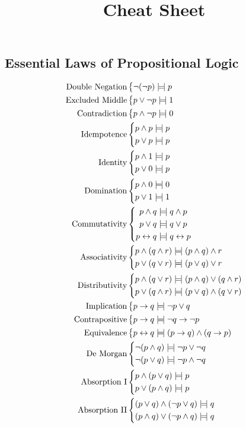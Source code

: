 \documentclass[class=cs245,nogeometry]{agony}
\title{Cheat Sheet}
\newcommand{\law}[2]{\text{#1}&\left\{\begin{aligned}#2\end{aligned}\right.\\}
\begin{document}
\begin{multicols}{2}
  \section*{Essential Laws of Propositional Logic}
  \begin{align*}
    \law{Double Negation}{\n(\n p) \tt p}
    \law{Excluded Middle}{p \o \n p \tt 1}
    \law{Contradiction}{p \a \n p \tt 0}
    \law{Idempotence}{
    p \a p                  & \tt p                    \\
    p \o p                  & \tt p                    \\
    }
    \law{Identity}{
    p \a 1                  & \tt p                    \\
    p \o 0                  & \tt p                    \\
    }
    \law{Domination}{
    p \a 0                  & \tt 0                    \\
    p \o 1                  & \tt 1                    \\
    }
    \law{Commutativity}{
    p \a q                  & \tt q \a p               \\
    p \o q                  & \tt q \o p               \\
    p \e q                  & \tt q \e p               \\
    }
    \law{Associativity}{
    p \a (q \a r)           & \tt (p \a q) \a r        \\
    p \o (q \o r)           & \tt (p \o q) \o r        \\
    }
    \law{Distributivity}{
    p \a (q \o r)           & \tt (p \a q) \o (q \a r) \\
    p \o (q \a r)           & \tt (p \o q) \a (q \o r) \\
    }
    \law{Implication}{p \i q \tt \n p \o q}
    \law{Contrapositive}{p \i q \tt \n q \i \n p}
    \law{Equivalence}{p \e q \tt (p \i q) \a (q \i p)}
    \law{De Morgan}{
    \n(p \a q)              & \tt \n p \o \n q         \\
    \n(p \o q)              & \tt \n p \a \n q         \\
    }
    \law{Absorption I}{
    p \a (p \o q)           & \tt p                    \\
    p \o (p \a q)           & \tt p                    \\
    }
    \law{Absorption II}{
    (p \o q) \a (\n p \o q) & \tt q                    \\
    (p \a q) \o (\n p \a q) & \tt q                    \\
    }
  \end{align*}

\end{multicols}
\end{document}
